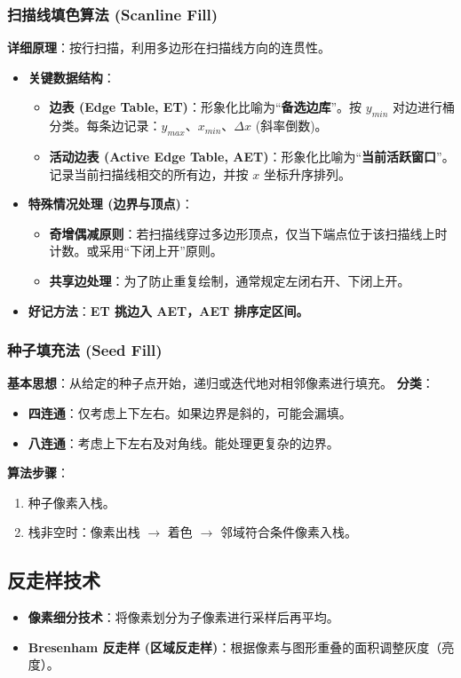 \documentclass[UTF8]{ctexart}
\begin{document}
\subsubsection{扫描线填色算法 (Scanline Fill)}
\textbf{详细原理}：按行扫描，利用多边形在扫描线方向的连贯性。
\begin{itemize}
    \item \textbf{关键数据结构}：
        \begin{itemize}
            \item \textbf{边表 (Edge Table, ET)}：形象化比喻为“\textbf{备选边库}”。按 $y_{min}$ 对边进行桶分类。每条边记录：$y_{max}$、$x_{min}$、$\Delta x$ (斜率倒数)。
            \item \textbf{活动边表 (Active Edge Table, AET)}：形象化比喻为“\textbf{当前活跃窗口}”。记录当前扫描线相交的所有边，并按 $x$ 坐标升序排列。
        \end{itemize}
    \item \textbf{特殊情况处理 (边界与顶点)}：
        \begin{itemize}
            \item \textbf{奇增偶减原则}：若扫描线穿过多边形顶点，仅当下端点位于该扫描线上时计数。或采用“下闭上开”原则。
            \item \textbf{共享边处理}：为了防止重复绘制，通常规定左闭右开、下闭上开。
        \end{itemize}
    \item \textbf{好记方法}：\textbf{ET 挑边入 AET，AET 排序定区间。}
\end{itemize}

\subsubsection{种子填充法 (Seed Fill)}
\textbf{基本思想}：从给定的种子点开始，递归或迭代地对相邻像素进行填充。
\textbf{分类}：
\begin{itemize}
    \item \textbf{四连通}：仅考虑上下左右。如果边界是斜的，可能会漏填。
    \item \textbf{八连通}：考虑上下左右及对角线。能处理更复杂的边界。
\end{itemize}
\textbf{算法步骤}：
\begin{enumerate}
    \item 种子像素入栈。
    \item 栈非空时：像素出栈 $\to$ 着色 $\to$ 邻域符合条件像素入栈。
\end{enumerate}

\subsection{反走样技术}
\begin{itemize}
    \item \textbf{像素细分技术}：将像素划分为子像素进行采样后再平均。
    \item \textbf{Bresenham 反走样 (区域反走样)}：根据像素与图形重叠的面积调整灰度（亮度）。
\end{itemize}
\end{document}
